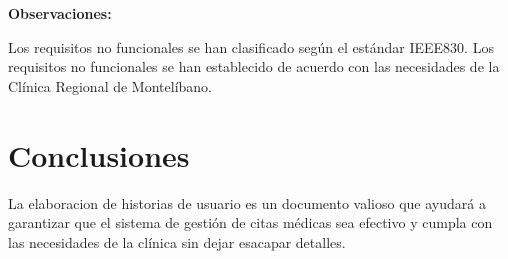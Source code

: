 \documentclass{article}
\theoremstyle{mytheoremstyle}
\theoremstyle{mytheoremstyle}
\theoremstyle{myproblemstyle}
\begin{document}
\textbf{Observaciones:}

Los requisitos no funcionales se han clasificado según el estándar IEEE830.
Los requisitos no funcionales se han establecido de acuerdo con las necesidades de la Clínica Regional de Montelíbano.
\section{Conclusiones}

La elaboracion de historias de usuario es un documento valioso que ayudará a garantizar que el sistema de gestión de citas médicas sea efectivo y cumpla con las necesidades de la clínica sin dejar esacapar detalles.
%
%
\end{document}

